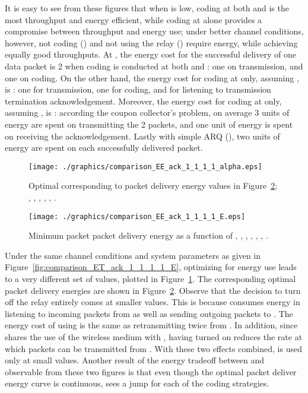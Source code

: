 \documentclass[journal, letterpaper]{IEEEtran}
\begin{document}
\begin{itemize}
It is easy to see from these figures that when  is low, coding at both  and  is the most throughput and energy efficient, while coding at  alone provides a compromise between throughput and energy use; under better channel conditions, however, not coding () and not using the relay () require energy, while achieving equally good throughputs. At , the energy cost for the successful delivery of one data packet is 2 when coding is conducted at both  and : one on transmission, and one on coding. On the other hand, the energy cost for coding at  only, assuming , is : one for transmission, one for coding, and  for listening to transmission termination acknowledgement. Moreover, the energy cost for coding at  only, assuming , is : according the coupon collector's problem, on average 3 units of energy are spent on transmitting the 2 packets, and one unit of energy is spent on receiving the acknowledgement. Lastly with simple ARQ (), two units of energy are spent on each successfully delivered packet.
\begin{figure}[t!]
\centering
  \texttt{[image: ./graphics/comparison\_EE\_ack\_1\_1\_1\_1\_alpha.eps]}
  \caption{Optimal  corresponding to packet delivery energy values in Figure~\ref{fig:comparison_EE_ack_1_1_1_1_E}; , , , , , .}
  \label{fig:comparison_EE_ack_1_1_1_1_alpha}
\end{figure}
\begin{figure}[t!]
  \centering
    \texttt{[image: ./graphics/comparison\_EE\_ack\_1\_1\_1\_1\_E.eps]}
    \caption{Minimum packet packet delivery energy  as a function of , , , , , , .}
    \label{fig:comparison_EE_ack_1_1_1_1_E}
\end{figure}
Under the same channel conditions and system parameters as given in Figure~\ref{fig:comparison_ET_ack_1_1_1_1_E}, optimizing for energy use leads to a very different set of  values, plotted in Figure~\ref{fig:comparison_EE_ack_1_1_1_1_alpha}. The corresponding optimal packet delivery energies are shown in Figure~\ref{fig:comparison_EE_ack_1_1_1_1_E}. Observe that the decision to turn off the relay  entirely comes at smaller  values. This is because  consumes energy in listening to incoming packets from  as well as sending outgoing packets to . The energy cost of using  is the same as retransmitting twice from . In addition, since  shares the use of the wireless medium with , having  turned on reduces the rate at which packets can be transmitted from . With these two effects combined,  is used only at small  values. Another result of the energy tradeoff between  and  observable from these two figures is that even though the optimal packet deliver energy curve is continuous,  sees a jump for each of the coding strategies.


\end{itemize}
\end{document}
